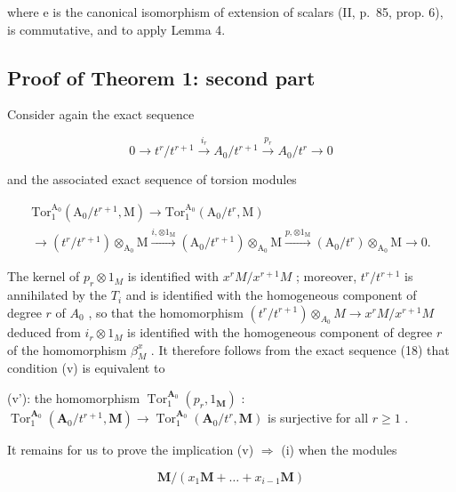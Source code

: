 where e is the canonical isomorphism of extension of scalars (II, p.~85, prop. 6), is commutative, and to apply Lemma 4.

\subsection{Proof of Theorem 1: second part}

Consider again the exact sequence

\[
0 \longrightarrow t ^ {r} / t ^ {r + 1} \xrightarrow {i _ {r}} A _ {0} / t ^ {r + 1} \xrightarrow {p _ {r}} A _ {0} / t ^ {r} \longrightarrow 0\tag{16}
\]

and the associated exact sequence of torsion modules

\[
\begin{array}{l} \text {Tor} _ {1} ^ {\mathrm{A} _ {0}} (\mathrm{A} _ {0} / t ^ {r + 1}, \mathrm{M}) \longrightarrow \mathrm{Tor} _ {1} ^ {\mathrm{A} _ {0}} (\mathrm{A} _ {0} / t ^ {r}, \mathrm{M}) \\ \longrightarrow (t ^ {r} / t ^ {r + 1}) \otimes_ {\mathrm{A} _ {0}} \mathrm{M} \xrightarrow {i , \otimes 1 _ {\mathrm{M}}} (\mathrm{A} _ {0} / t ^ {r + 1}) \otimes_ {\mathrm{A} _ {0}} \mathrm{M} \xrightarrow {p , \otimes 1 _ {\mathrm{M}}} (\mathrm{A} _ {0} / t ^ {r}) \otimes_ {\mathrm{A} _ {0}} \mathrm{M} \longrightarrow 0. \end{array} \tag {18}
\]

The kernel of \(p_r \otimes 1_M\) is identified with \(x^r M/x^{r+1} M\) ; moreover, \(t^r/t^{r+1}\) is annihilated by the \(T_i\) and is identified with the homogeneous component of degree \(r\) of \(A_0\) , so that the homomorphism \((t^r/t^{r+1}) \otimes_{A_0} M \to x^r M/x^{r+1} M\) deduced from \(i_r \otimes 1_M\) is identified with the homogeneous component of degree \(r\) of the homomorphism \(\beta_M^x\) . It therefore follows from the exact sequence (18) that condition (v) is equivalent to

(v'): the homomorphism \(\operatorname{Tor}_{1}^{\mathbf{A}_{0}}(p_{r},1_{\mathbf{M}})\) : \(\operatorname{Tor}_{1}^{\mathbf{A}_{0}}(\mathbf{A}_{0}/t^{r+1},\mathbf{M})\to\operatorname{Tor}_{1}^{\mathbf{A}_{0}}(\mathbf{A}_{0}/t^{r},\mathbf{M})\) is surjective for all \(r\geqslant1\) .

It remains for us to prove the implication (v) \(\Rightarrow\) (i) when the modules

\[
\mathbf {M} / (x _ {1} \mathbf {M} + \dots + x _ {i - 1} \mathbf {M})
\]

